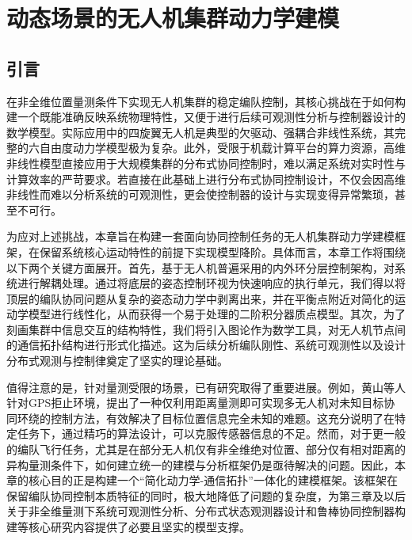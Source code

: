 
\chapter{动态场景的无人机集群动力学建模}

\section{引言}
在非全维位置量测条件下实现无人机集群的稳定编队控制，其核心挑战在于如何构建一个既能准确反映系统物理特性，又便于进行后续可观测性分析与控制器设计的数学模型。实际应用中的四旋翼无人机是典型的欠驱动、强耦合非线性系统，其完整的六自由度动力学模型极为复杂。此外，受限于机载计算平台的算力资源，高维非线性模型直接应用于大规模集群的分布式协同控制时，难以满足系统对实时性与计算效率的严苛要求\cite{2014Programmable}。若直接在此基础上进行分布式协同控制设计，不仅会因高维非线性而难以分析系统的可观测性，更会使控制器的设计与实现变得异常繁琐，甚至不可行。

为应对上述挑战，本章旨在构建一套面向协同控制任务的无人机集群动力学建模框架，在保留系统核心运动特性的前提下实现模型降阶。具体而言，本章工作将围绕以下两个关键方面展开。首先，基于无人机普遍采用的内外环分层控制架构，对系统进行解耦处理。通过将底层的姿态控制环视为快速响应的执行单元，我们得以将顶层的编队协同问题从复杂的姿态动力学中剥离出来，并在平衡点附近对简化的运动学模型进行线性化，从而获得一个易于处理的二阶积分器质点模型。其次，为了刻画集群中信息交互的结构特性，我们将引入图论作为数学工具，对无人机节点间的通信拓扑结构进行形式化描述。这为后续分析编队刚性、系统可观测性以及设计分布式观测与控制律奠定了坚实的理论基础。

值得注意的是，针对量测受限的场景，已有研究取得了重要进展。例如，黄山等人\parencite{HKXB202413019}针对GPS拒止环境，提出了一种仅利用距离量测即可实现多无人机对未知目标协同环绕的控制方法，有效解决了目标位置信息完全未知的难题。这充分说明了在特定任务下，通过精巧的算法设计，可以克服传感器信息的不足。然而，对于更一般的编队飞行任务，尤其是在部分无人机仅有非全维绝对位置、部分仅有相对距离的异构量测条件下，如何建立统一的建模与分析框架仍是亟待解决的问题。因此，本章的核心目的正是构建一个“简化动力学-通信拓扑”一体化的建模框架。该框架在保留编队协同控制本质特征的同时，极大地降低了问题的复杂度，为第三章及以后关于非全维量测下系统可观测性分析、分布式状态观测器设计和鲁棒协同控制器构建等核心研究内容提供了必要且坚实的模型支撑。

